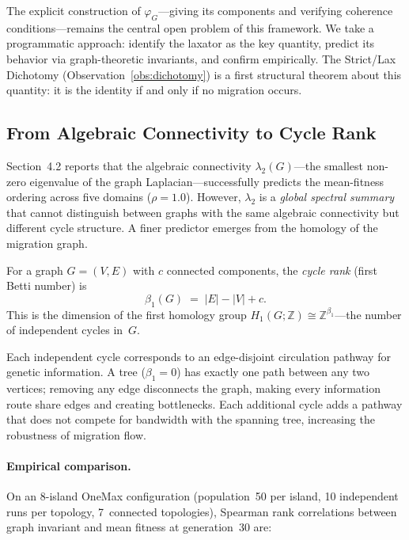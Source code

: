 \begin{remark}
The explicit construction of $\varphi_G$---giving its components and
verifying coherence conditions---remains the central open problem of
this framework.  We take a programmatic approach: identify the laxator
as the key quantity, predict its behavior via graph-theoretic
invariants, and confirm empirically.  The Strict/Lax Dichotomy
(Observation~\ref{obs:dichotomy}) is a first structural theorem about
this quantity: it is the identity if and only if no migration occurs.
\end{remark}


\subsection{From Algebraic Connectivity to Cycle Rank}
\label{sec:cycle-rank}

Section~4.2 reports that the algebraic connectivity $\lambda_2(G)$---the
smallest non-zero eigenvalue of the graph Laplacian---successfully
predicts the mean-fitness ordering across five domains ($\rho = 1.0$).
However, $\lambda_2$ is a \emph{global spectral summary} that cannot
distinguish between graphs with the same algebraic connectivity but
different cycle structure.  A finer predictor emerges from the
homology of the migration graph.

\begin{definition}
For a graph $G = (V, E)$ with $c$ connected components, the
\emph{cycle rank} (first Betti number) is
\[
  \beta_1(G) \;=\; |E| - |V| + c.
\]
This is the dimension of the first homology group
$H_1(G;\mathbb{Z}) \cong \mathbb{Z}^{\beta_1}$---the number of
independent cycles in~$G$.
\end{definition}

Each independent cycle corresponds to an edge-disjoint circulation
pathway for genetic information.  A tree ($\beta_1 = 0$) has exactly
one path between any two vertices; removing any edge disconnects the
graph, making every information route share edges and creating
bottlenecks.  Each additional cycle adds a pathway that does not
compete for bandwidth with the spanning tree, increasing the robustness
of migration flow.

\paragraph{Empirical comparison.}
On an 8-island OneMax configuration (population~50 per island, 10
independent runs per topology, 7~connected topologies), Spearman rank
correlations between graph invariant and mean fitness at generation~30
are:

